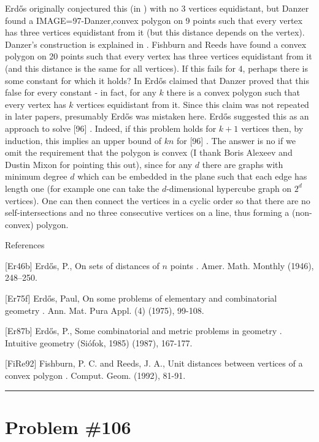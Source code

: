 \documentclass{article}
\begin{document}
Erd\H{o}s originally conjectured this (in \cite{Er46b}) with no $3$ vertices equidistant, but Danzer found a {IMAGE=97-Danzer,convex polygon} on 9 points such that every vertex has three vertices equidistant from it (but this distance depends on the vertex). Danzer's construction is explained in \cite{Er87b}. Fishburn and Reeds \cite{FiRe92} have found a convex polygon on 20 points such that every vertex has three vertices equidistant from it (and this distance is the same for all vertices). If this fails for $4$, perhaps there is some constant for which it holds? In \cite{Er75f} Erd\H{o}s claimed that Danzer proved that this false for every constant - in fact, for any $k$ there is a convex polygon such that every vertex has $k$ vertices equidistant from it. Since this claim was not repeated in later papers, presumably Erd\H{o}s was mistaken here. Erd\H{o}s suggested this as an approach to solve [96] . Indeed, if this problem holds for $k+1$ vertices then, by induction, this implies an upper bound of $kn$ for [96] . The answer is no if we omit the requirement that the polygon is convex (I thank Boris Alexeev and Dustin Mixon for pointing this out), since for any $d$ there are graphs with minimum degree $d$ which can be embedded in the plane such that each edge has length one (for example one can take the $d$-dimensional hypercube graph on $2^d$ vertices). One can then connect the vertices in a cyclic order so that there are no self-intersections and no three consecutive vertices on a line, thus forming a (non-convex) polygon.




References

[Er46b] Erd\H{o}s, P., On sets of distances of {$n$} points . Amer. Math. Monthly (1946), 248--250.

[Er75f] Erd\H{o}s, Paul, On some problems of elementary and combinatorial geometry . Ann. Mat. Pura Appl. (4) (1975), 99-108.

[Er87b] Erd\H{o}s, P., Some combinatorial and metric problems in geometry . Intuitive geometry (Si\'{o}fok, 1985) (1987), 167-177.

[FiRe92] Fishburn, P. C. and Reeds, J. A., Unit distances between vertices of a convex polygon . Comput. Geom. (1992), 81-91.

\noindent\rule{\linewidth}{0.4pt}


\section{Problem \#106}
\label{prob:106}
\end{document}
